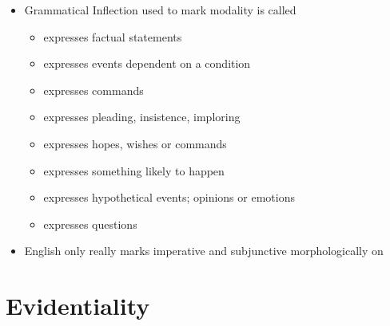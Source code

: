 \documentclass[headrule,footrule]{foils}
\begin{document}
\begin{itemize}
\item Grammatical Inflection used to mark modality is called 
  \begin{itemize}
  \item {} expresses factual statements
  \item {} expresses events dependent on a condition
  \item {} expresses commands
  \item {} expresses pleading, insistence, imploring
  \item {} expresses hopes, wishes or commands 
  \item {} expresses something likely to happen
  \item {} expresses  hypothetical events; opinions or emotions
  \item {} expresses questions
\end{itemize}
\item English only really marks imperative and subjunctive
  morphologically on  
  \begin{exe}
    \ex {}
    \ex {}
  \end{exe}
\end{itemize}
\section{Evidentiality}
\end{document}
